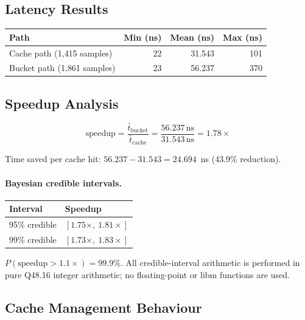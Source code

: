 \subsection{Latency Results}

\begin{center}
\begin{tabular}{lrrr}
\toprule
Path & Min (ns) & Mean (ns) & Max (ns) \\
\midrule
Cache path (1{,}415 samples)  & 22 & 31.543 & 101 \\
Bucket path (1{,}861 samples) & 23 & 56.237 & 370 \\
\bottomrule
\end{tabular}
\end{center}

\subsection{Speedup Analysis}

\begin{equation}
  \text{speedup} = \frac{\bar{t}_{\text{bucket}}}{\bar{t}_{\text{cache}}}
                 = \frac{56.237\,\text{ns}}{31.543\,\text{ns}}
                 = 1.78\times
\end{equation}

Time saved per cache hit: $56.237 - 31.543 = 24.694$~ns (43.9\% reduction).

\paragraph{Bayesian credible intervals.}

\begin{center}
\begin{tabular}{ll}
\toprule
Interval & Speedup \\
\midrule
95\% credible & $[1.75\times,\ 1.81\times]$ \\
99\% credible & $[1.73\times,\ 1.83\times]$ \\
\bottomrule
\end{tabular}
\end{center}

$P(\text{speedup} > 1.1\times) = 99.9\%$. All credible-interval arithmetic
is performed in pure Q48.16 integer arithmetic; no floating-point or libm
functions are used.

\subsection{Cache Management Behaviour}

